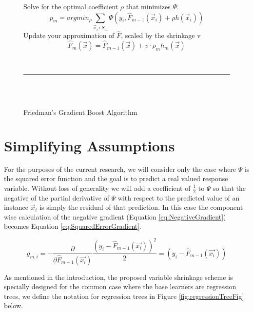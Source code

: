 \documentclass[9pt, conference]{IEEEtran}
\begin{document}
\begin{figure}[t]
\begin{algorithm}[H]
{\begin{equation}
			\end{equation}		
			Solve for the optimal coefficient \(\rho\) that minimizes \(\Psi\).
			\begin{equation}
			p_m = argmin_\rho \sum_{\vec{x}_i \, \epsilon \, S_m}\Psi(y_i, \hat{F}_{m-1}(\vec{x}_i) + \rho h(\vec{x}_i))
			\label{eq:ScalingCoefficent}
			\end{equation}
			Update your approximation of \(\hat{F}\), scaled by the shrinkage v
			\begin{equation}
			\hat{F}_m(\vec{x}) = \hat{F}_{m-1}(\vec{x}) + v  \cdot  \rho_m h_m(\vec{x})
			\label{eq:UpdateStep}
			\end{equation}
		}
		\caption{Friedman's Gradient Boost Algorithm  \cite{2001Friedman} \cite{GBMTut} \cite{2002Friedman} \cite{death2007ABT}}
		\hspace{1 mm} \\\hrule\hspace{1 mm} \\\hspace{1 mm} \\
		\label{alg:GeneralGradientBoost}
	\end{algorithm}

\end{figure}
\section{Simplifying Assumptions}
\label{sec:SimplifyingAssumptions}
For the purposes of the current research, we will consider only the case where \(\Psi\) is the squared error function and the goal is to predict a real valued response variable. Without loss of generality we will add a coefficient of \(\frac{1}{2}\) to \(\Psi\) so that the negative of the partial derivative of \(\Psi\) with respect to the predicted value of an instance \(\vec{x}_i\) is simply the residual of that prediction. In this case the component wise calculation of the negative gradient (Equation \ref{eq:NegativeGradient}) becomes Equation \ref{eq:SquaredErrorGradient}.

\begin{equation}
g_{m,i} = -\frac{\partial}{\partial \hat{F}_{m-1}(\vec{x_i})} \frac{(y_i - \hat{F}_{m-1}(\vec{x_i}))^2}{2} = (y_i - \hat{F}_{m-1}(\vec{x_i}))
\label{eq:SquaredErrorGradient}
\end{equation}

As mentioned in the introduction, the proposed variable shrinkage scheme is specially designed for the common case where the base learners are regression trees, we define the notation for regression trees in Figure \ref{fig:regressionTreeFig} below.
\end{document}
